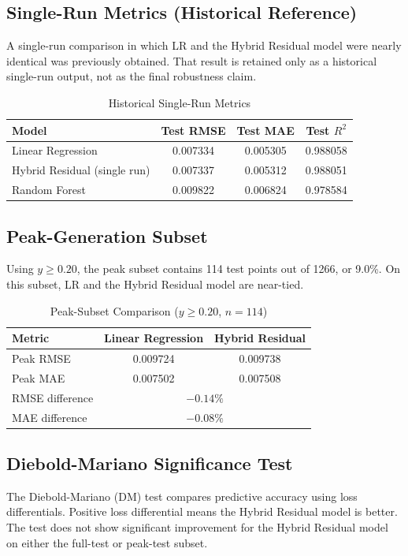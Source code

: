 \documentclass{ieeeaccess}
\begin{document}
\subsection{Single-Run Metrics (Historical Reference)}
A single-run comparison in which LR and the Hybrid Residual model were nearly identical was previously obtained. That result is retained only as a historical single-run output, not as the final robustness claim.

\begin{table}[!t]
\caption{Historical Single-Run Metrics}
\label{tab:single_run}
\centering
\begin{tabular}{lccc}
\toprule
Model & Test RMSE & Test MAE & Test $R^2$ \\
\midrule
Linear Regression & 0.007334 & 0.005305 & 0.988058 \\
Hybrid Residual (single run) & 0.007337 & 0.005312 & 0.988051 \\
Random Forest & 0.009822 & 0.006824 & 0.978584 \\
\bottomrule
\end{tabular}
\end{table}

\subsection{Peak-Generation Subset}
Using $y \ge 0.20$, the peak subset contains 114 test points out of 1266, or 9.0\%. On this subset, LR and the Hybrid Residual model are near-tied.

\begin{table}[!t]
\caption{Peak-Subset Comparison ($y \ge 0.20$, $n=114$)}
\label{tab:peak_subset}
\centering
\begin{tabular}{lcc}
\toprule
Metric & Linear Regression & Hybrid Residual \\
\midrule
Peak RMSE & 0.009724 & 0.009738 \\
Peak MAE & 0.007502 & 0.007508 \\
RMSE difference & \multicolumn{2}{c}{$-0.14\%$} \\
MAE difference & \multicolumn{2}{c}{$-0.08\%$} \\
\bottomrule
\end{tabular}
\end{table}

\subsection{Diebold-Mariano Significance Test}
The Diebold-Mariano (DM) test compares predictive accuracy using loss differentials. Positive loss differential means the Hybrid Residual model is better. The test does not show significant improvement for the Hybrid Residual model on either the full-test or peak-test subset.
\end{document}
